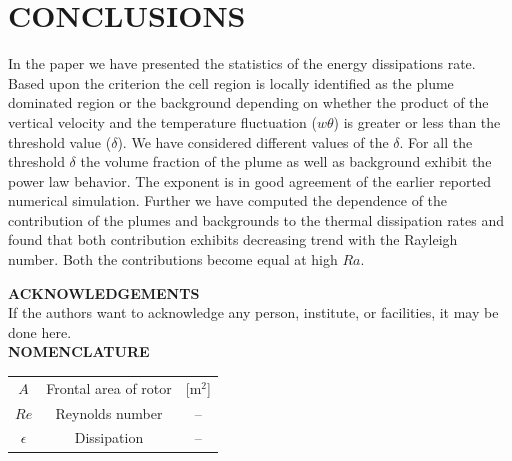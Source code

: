 \documentclass[10pt, conference]{FMFP2022}
\begin{document}
\section{\textbf{CONCLUSIONS}}\label{sec4}
In the paper we have presented the statistics of the energy dissipations rate. Based upon the criterion the cell region is locally identified as the plume dominated region or the background depending on whether the product of the vertical velocity and the temperature fluctuation  ($w\theta$) is greater or less than the threshold value ($\delta$).  We have considered different values of the $\delta$. For all the threshold $\delta$ the volume fraction of the plume as well as background exhibit the power law behavior. The exponent is in good agreement of the earlier reported numerical simulation. Further we have computed the dependence of the contribution of the plumes and backgrounds to the thermal dissipation rates and found that both contribution exhibits decreasing trend with the Rayleigh number. Both the contributions become equal at high $Ra$. 

\vspace{0.5cm}
\noindent
\textbf{ACKNOWLEDGEMENTS}\\
\noindent If the authors want to acknowledge any person, institute, or facilities, it may be done here. \\

\vspace{0.5cm}
 \noindent
\textbf{NOMENCLATURE}\\

\begin{tabular}{ccc}
$A$ & Frontal area of rotor & [m$^2$]\\
$Re$ & Reynolds number & -- \\
$\epsilon$ & Dissipation & --
\end{tabular}




    
\end{document}
